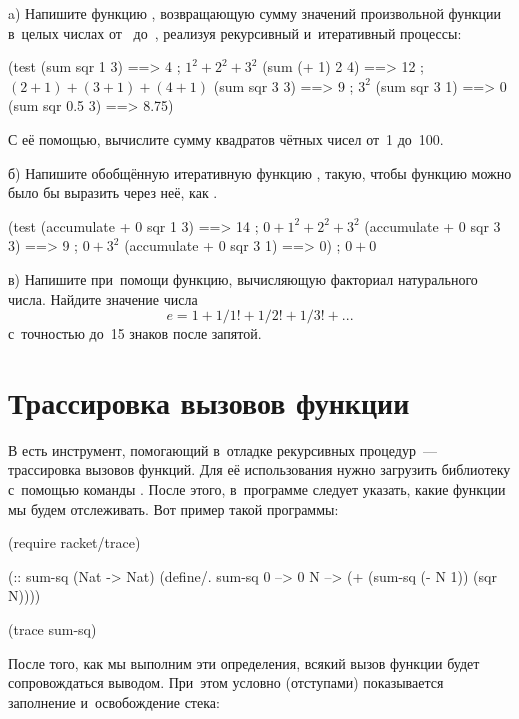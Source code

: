 \begin{Assignment}

a) Напишите функцию , возвращающую сумму значений произвольной функции  в~целых числах от~ до~, реализуя рекурсивный и~итеративный процессы:
\begin{Specification}
  (test 
    (sum sqr 1 3)   ==> 4    ; $1^2 + 2^2 + 3^2$
    (sum (+ 1) 2 4) ==> 12   ; $(2+1) + (3+1) + (4+1)$
    (sum sqr 3 3)   ==> 9    ; $3^2$
    (sum sqr 3 1)   ==> 0
    (sum sqr 0.5 3) ==> 8.75)
\end{Specification}
С её помощью, вычислите сумму квадратов чётных чисел от~1 до~100.

\smallskip
б) \label{accumulate}Напишите обобщённую итеративную функцию , такую, чтобы функцию  можно было бы выразить через неё, как . 
\begin{Specification}
  (test         
    (accumulate + 0 sqr 1 3) ==> 14  ; $0 + 1^2 +2^2 + 3^2$
    (accumulate + 0 sqr 3 3) ==> 9   ; $0 + 3^2$
    (accumulate + 0 sqr 3 1) ==> 0)  ; $0 + 0$
\end{Specification}

в) \label{ass:exp} Напишите при~помощи  функцию, вычисляющую факториал натурального числа. Найдите значение числа $$e = 1 + 1/1! + 1/2! + 1/3! +...$$ с~точностью до~15 знаков после запятой.

\end{Assignment}

\section{Трассировка вызовов функции}%
В \Scheme есть инструмент, помогающий в~отладке рекурсивных процедур~--- трассировка вызовов функций. Для её использования нужно загрузить библиотеку  с~помощью команды . После этого, в~программе следует указать, какие функции мы будем отслеживать. Вот пример такой программы:

\begin{Definition}[emph=N]
(require racket/trace)

(:: sum-sq (Nat -> Nat)
  (define/. sum-sq
    0 --> 0
    N --> (+ (sum-sq (- N 1)) (sqr N))))

(trace sum-sq)
\end{Definition}

После того, как мы выполним эти определения, всякий вызов функции  будет сопровождаться выводом. При~этом условно (отступами) показывается заполнение и~освобождение стека:

